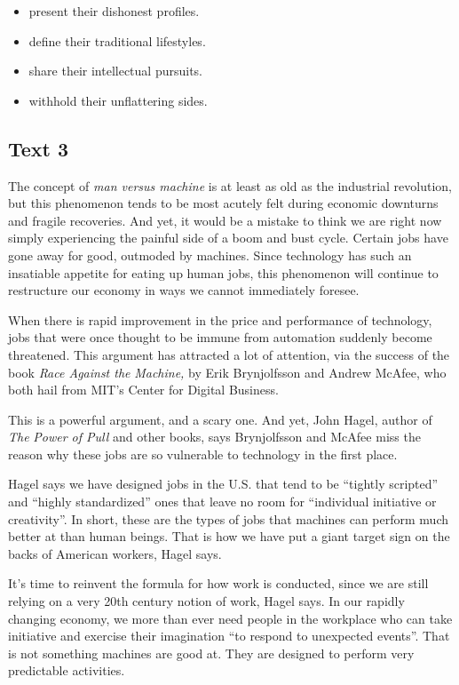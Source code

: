 \documentclass[UTF8,11pt]{ctexart}
\begin{document}
\begin{itemize}[leftmargin=2em,itemsep=.2em,topsep=.4em]\item[A.] present their dishonest profiles.
\item[B.] define their traditional lifestyles.
\item[C.] share their intellectual pursuits.
\item[D.] withhold their unflattering sides.
\end{itemize}

\subsection*{\textbf{Text 3}}


The concept of \textit{man versus machine} is at least as old as the industrial revolution, but this phenomenon tends to be most acutely felt during economic downturns and fragile recoveries. And yet, it would be a mistake to think we are right now simply experiencing the painful side of a boom and bust cycle. Certain jobs have gone away for good, outmoded by machines. Since technology has such an insatiable appetite for eating up human jobs, this phenomenon will continue to restructure our economy in ways we cannot immediately foresee.


When there is rapid improvement in the price and performance of technology, jobs that were once thought to be immune from automation suddenly become threatened. This argument has attracted a lot of attention, via the success of the book \textit{Race Against the} \textit{Machine,} by Erik Brynjolfsson and Andrew McAfee, who both hail from MIT’s Center for Digital Business.


This is a powerful argument, and a scary one. And yet, John Hagel, author of \textit{The} \textit{Power of Pull} and other books, says Brynjolfsson and McAfee miss the reason why these jobs are so vulnerable to technology in the first place.


Hagel says we have designed jobs in the U.S. that tend to be “tightly scripted” and “highly standardized” ones that leave no room for “individual initiative or creativity”. In short, these are the types of jobs that machines can perform much better at than human beings. That is how we have put a giant target sign on the backs of American workers, Hagel says.


It’s time to reinvent the formula for how work is conducted, since we are still relying on a very 20th century notion of work, Hagel says. In our rapidly changing economy, we more than ever need people in the workplace who can take initiative and exercise their imagination “to respond to unexpected events”. That is not something machines are good at. They are designed to perform very predictable activities.
\end{document}
